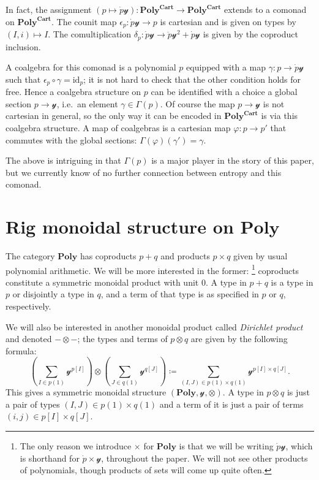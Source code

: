 \documentclass[11pt, one side, article]{memoir}
\theoremstyle{definition}
\theoremstyle{plain}
\newenvironment{remark}
  {\pushQED{\qed}\renewcommand{\qedsymbol}{$\lozenge$}\remarkx}
  {\popQED\endremarkx}
\newcommand{\Cat}[1]{\mathbf{#1}}%
\newcommand{\id}{\mathrm{id}}
\newcommand{\yon}{\mathcal{y}}
\newcommand{\poly}{\Cat{Poly}}
\newcommand{\polycart}{\poly^{\Cat{Cart}}}
\newcommand{\0}{\textsf{0}}
\newcommand{\1}{\tn{\textsf{1}}}
\begin{document}
\begin{remark}\label{rem.comonad}
In fact, the assignment $(p\mapsto\dot{p}\yon)\colon\polycart\to\polycart$ extends to a comonad on $\polycart$. The counit map $\epsilon_p\colon\dot{p}\yon\to p$ is cartesian and is given on types by $(I,i)\mapsto I$. The comultiplication $\delta_p\colon\dot{p}\yon\to\ddot{p}\yon^2+\dot{p}\yon$ is given by the coproduct inclusion.

A coalgebra for this comonad is a polynomial $p$ equipped with a map $\gamma\colon p\to\dot{p}\yon$ such that $\epsilon_p\circ\gamma=\id_p$; it is not hard to check that the other condition holds for free. Hence a coalgebra structure on $p$ can be identified with a choice a global section $p\to\yon$, i.e.\ an element $\gamma\in\Gamma(p)$. Of course the map $p\to\yon$ is not cartesian in general, so the only way it can be encoded in $\polycart$ is via this coalgebra structure. A map of coalgebras is a cartesian map $\varphi\colon p\to p'$ that commutes with the global sections: $\Gamma(\varphi)(\gamma')=\gamma$.

The above is intriguing in that $\Gamma(p)$ is a major player in the story of this paper, but we currently know of no further connection between entropy and this comonad. 
\end{remark}

\section{Rig monoidal structure on $\poly$}\label{sec.rig}

The category $\poly$ has coproducts $p+q$ and products $p\times q$ given by usual polynomial arithmetic. We will be more interested in the former:%
\footnote{
The only reason we introduce $\times$ for $\poly$ is that we will be writing $\dot{p}\yon$, which is shorthand for $\dot{p}\times\yon$, throughout the paper. We will not see other products of polynomials, though products of sets will come up quite often.
}
coproducts constitute a symmetric monoidal product with unit $0$. A type in $p+q$ is a type in $p$ or disjointly a type in $q$, and a term of that type is as specified in $p$ or $q$, respectively.

We will also be interested in another monoidal product called \emph{Dirichlet product} and denoted $-\otimes-$; the types and terms of $p\otimes q$ are given by the following formula:
\begin{equation}\label{eqn.dir_formula}
  \left(\sum_{I\in p(1)}\yon^{p[I]}\right)\otimes
  \left(\sum_{J\in q(1)}\yon^{q[J]}\right)\coloneqq
  \sum_{(I,J)\in p(1)\times q(1)}\yon^{p[I]\times q[J]}.
\end{equation}
This gives a symmetric monoidal structure $(\poly,\yon,\otimes)$. A type in $p\otimes q$ is just a pair of types $(I,J)\in p(1)\times q(1)$ and a term of it is just a pair of terms $(i,j)\in p[I]\times q[J]$.
\end{document}
